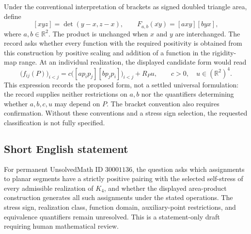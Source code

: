 \documentclass[11pt]{article}
\newcommand{\R}{\mathbb{R}}
\begin{document}
Under the conventional interpretation of brackets as signed doubled triangle area, define
\[
[xyz]=\det(y-x,z-x),\qquad
F_{a,b}(\overline{xy})=[axy][byx],
\]
where \(a,b\in\R^2\). The product is unchanged when \(x\) and \(y\) are interchanged. The record asks whether every function with the required positivity is obtained from this construction by positive scaling and addition of a function in the rigidity-map range. At an individual realization, the displayed candidate form would read
\[
\bigl(f_{ij}(P)\bigr)_{i<j}
=c\bigl([ap_ip_j][bp_jp_i]\bigr)_{i<j}+R_Pu,
\qquad c>0,\quad u\in(\R^2)^4.
\]
This expression records the proposed form, not a settled universal formulation: the record supplies neither restrictions on \(a,b\) nor the quantifiers determining whether \(a,b,c,u\) may depend on \(P\). The bracket convention also requires confirmation. Without these conventions and a stress sign selection, the requested classification is not fully specified.
\subsection{Short English statement}
For permanent UnsolvedMath ID \(30001136\), the question asks which assignments to planar segments have a strictly positive pairing with the selected self-stress of every admissible realization of \(K_4\), and whether the displayed area-product construction generates all such assignments under the stated operations. The stress sign, realization class, function domain, auxiliary-point restrictions, and equivalence quantifiers remain unresolved. This is a statement-only draft requiring human mathematical review.
\end{document}
